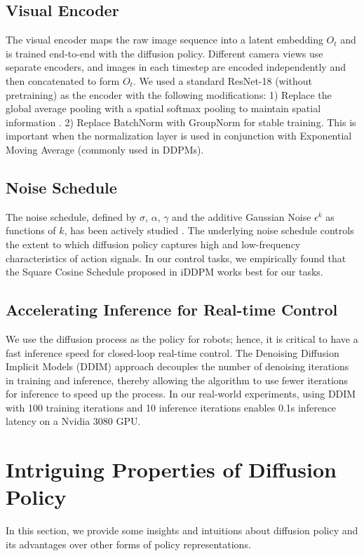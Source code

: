 \subsection{Visual Encoder}
\label{sec:method-visual}
The visual encoder  maps the raw image sequence into a latent embedding $O_t$ and is trained end-to-end with the diffusion policy.
Different camera views use separate encoders, and images in each timestep are encoded independently and then concatenated to form $O_t$.
We used a standard ResNet-18 (without pretraining) as the encoder with the following modifications:
1) Replace the global average pooling with a spatial softmax pooling to maintain spatial information \cite{robomimic}.
2) Replace BatchNorm with GroupNorm \cite{groupnorm} for stable training. This is important when the normalization layer is used in conjunction with Exponential Moving Average \cite{he2020moco} (commonly used in DDPMs).

\subsection{Noise Schedule}
\label{sec:method-noise-schedule}
The noise schedule, defined by $\sigma$, $\alpha$, $\gamma$ and the additive Gaussian Noise $\epsilon^k$ as functions of $k$, has been actively studied \cite{ho2020denoising, nichol2021improved}.  The underlying noise schedule controls the extent to which diffusion policy captures high and low-frequency characteristics of action signals. In our control tasks, we empirically found that the Square Cosine Schedule proposed in iDDPM \cite{nichol2021improved} works best for our tasks.

\subsection{Accelerating Inference for Real-time Control}
We use the diffusion process as the policy for robots; hence, it is critical to have a fast inference speed for closed-loop real-time control. The Denoising Diffusion Implicit Models (DDIM) approach \cite{song2021ddim}  decouples the number of denoising iterations in training and inference, thereby allowing the algorithm to use fewer iterations for inference to speed up the process. In our real-world experiments, using DDIM with 100 training iterations and 10 inference iterations enables 0.1s inference latency on a Nvidia 3080 GPU.

\section{Intriguing Properties of Diffusion Policy}
In this section, we provide some insights and intuitions about diffusion policy and its advantages over other forms of policy representations.



